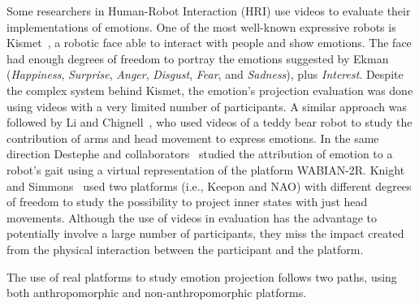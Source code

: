 Some researchers in Human-Robot Interaction (HRI) use videos to evaluate their implementations of emotions. One of the most well-known expressive robots is Kismet~\cite{Breazeal2002}, a robotic face able to interact with people and show emotions. The face had enough degrees of freedom to portray the emotions suggested by Ekman~\cite{Ekman2004} (\textit{Happiness}, \textit{Surprise}, \textit{Anger}, \textit{Disgust}, \textit{Fear}, and \textit{Sadness}), plus \textit{Interest}. 
Despite the complex system behind Kismet, the emotion's projection evaluation was done using videos with a very limited number of participants. A similar approach was followed by Li and Chignell~\cite{Li2011}, who used videos of a teddy bear robot to study the contribution of arms and head movement to express emotions. In the same direction Destephe and collaborators~\cite{Destephe2013} studied the attribution of emotion to a robot's gait using a virtual representation of the platform WABIAN-2R. Knight and Simmons~\cite{knight2016} used two platforms (i.e., Keepon and NAO) with different degrees of freedom to study the possibility to project inner states with just head movements. Although the use of videos in evaluation has the advantage to potentially involve a large number of participants, they miss the impact created from the physical interaction between the participant and the platform.

The use of real platforms to study emotion projection follows two paths, using both anthropomorphic and non-anthropomorphic platforms. 

